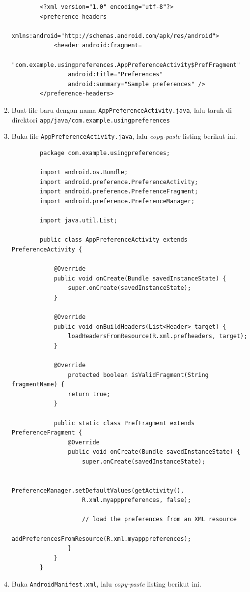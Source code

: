 \documentclass{scrartcl}
\begin{document}
\begin{enumerate}
		\begin{verbatim}
		<?xml version="1.0" encoding="utf-8"?>
		<preference-headers
			xmlns:android="http://schemas.android.com/apk/res/android">
			<header android:fragment= 
				"com.example.usingpreferences.AppPreferenceActivity$PrefFragment"
				android:title="Preferences"
				android:summary="Sample preferences" />
		</preference-headers>
		\end{verbatim}
		
		\item Buat file baru dengan nama \texttt{AppPreferenceActivity.java}, lalu taruh di direktori \texttt{app/java/com.example.usingpreferences}
		
		\item Buka file \texttt{AppPreferenceActivity.java}, lalu \textit{copy-paste} listing berikut ini.
		
		\begin{verbatim}
		package com.example.usingpreferences;
		
		import android.os.Bundle;
		import android.preference.PreferenceActivity;
		import android.preference.PreferenceFragment;
		import android.preference.PreferenceManager;
		
		import java.util.List;
		
		public class AppPreferenceActivity extends PreferenceActivity {
		
			@Override
			public void onCreate(Bundle savedInstanceState) {
				super.onCreate(savedInstanceState);
			}
			
			@Override
			public void onBuildHeaders(List<Header> target) {
				loadHeadersFromResource(R.xml.prefheaders, target);
			}
			
			@Override
				protected boolean isValidFragment(String fragmentName) {
				return true;
			}
			
			public static class PrefFragment extends   PreferenceFragment {
				@Override
				public void onCreate(Bundle savedInstanceState) {
					super.onCreate(savedInstanceState);
			
					PreferenceManager.setDefaultValues(getActivity(),
					R.xml.myapppreferences, false);
			
					// load the preferences from an XML resource
					addPreferencesFromResource(R.xml.myapppreferences);
				}
			}
		}
		\end{verbatim}
		
		\item Buka \texttt{AndroidManifest.xml}, lalu \textit{copy-paste} listing berikut ini.
		

\end{enumerate}
\end{document}
